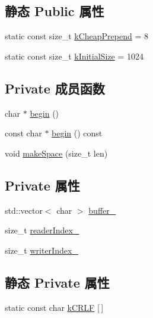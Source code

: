 \subsection*{静态 Public 属性}
\begin{DoxyCompactItemize}
\item 
static const size\+\_\+t \hyperlink{classmuduo_1_1net_1_1Buffer_a7c7e801837b45cd542d00cc5ec88dcb1}{k\+Cheap\+Prepend} = 8
\item 
static const size\+\_\+t \hyperlink{classmuduo_1_1net_1_1Buffer_a50181a12c6e534352c6c3cf9e0d8b331}{k\+Initial\+Size} = 1024
\end{DoxyCompactItemize}
\subsection*{Private 成员函数}
\begin{DoxyCompactItemize}
\item 
char $\ast$ \hyperlink{classmuduo_1_1net_1_1Buffer_ad431daee7daddf53f8aca682ddf3c940}{begin} ()
\item 
const char $\ast$ \hyperlink{classmuduo_1_1net_1_1Buffer_a5386e98f71cb440232f0c41041f50af4}{begin} () const
\item 
void \hyperlink{classmuduo_1_1net_1_1Buffer_a83d5a5ce302569b35df7743314578791}{make\+Space} (size\+\_\+t len)
\end{DoxyCompactItemize}
\subsection*{Private 属性}
\begin{DoxyCompactItemize}
\item 
std\+::vector$<$ char $>$ \hyperlink{classmuduo_1_1net_1_1Buffer_a906f9199a48e49dfaa86ba3e8edd0269}{buffer\+\_\+}
\item 
size\+\_\+t \hyperlink{classmuduo_1_1net_1_1Buffer_a8af076cf34524e62b7392ca568468a7d}{reader\+Index\+\_\+}
\item 
size\+\_\+t \hyperlink{classmuduo_1_1net_1_1Buffer_a642726abccc15af160d55735b2ed5d9a}{writer\+Index\+\_\+}
\end{DoxyCompactItemize}
\subsection*{静态 Private 属性}
\begin{DoxyCompactItemize}
\item 
static const char \hyperlink{classmuduo_1_1net_1_1Buffer_aba43e9a92549451389054f6cd4aec2b4}{k\+C\+R\+LF} \mbox{[}$\,$\mbox{]}
\end{DoxyCompactItemize}
